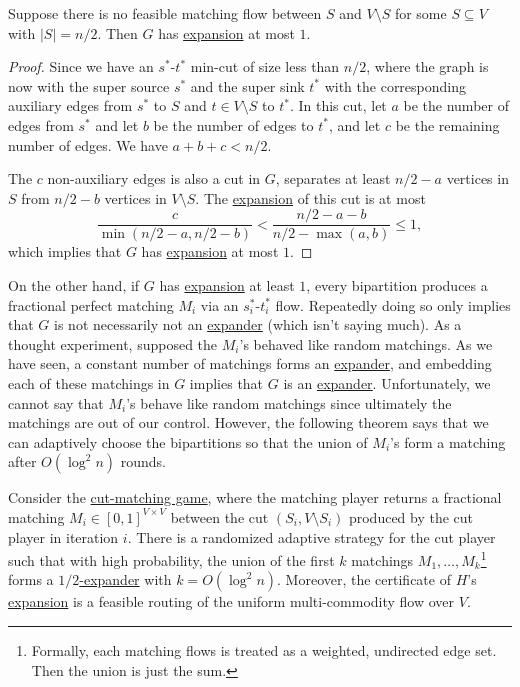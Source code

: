\begin{lemma}\label{lma:cut-matching-fail}
	Suppose there is no feasible matching flow between \(S\) and \(V\setminus S\) for some \(S \subseteq V\) with \(\lvert S \rvert = n / 2\). Then \(G\) has \hyperref[def:expansion]{expansion} at most \(1\).
\end{lemma}
\begin{proof}
	Since we have an \(s^{\ast}\)-\(t^{\ast} \) min-cut of size less than \(n / 2\), where the graph is now with the super source \(s^{\ast} \) and the super sink \(t^{\ast} \) with the corresponding auxiliary edges from \(s^{\ast} \) to \(S\) and \(t \in V\setminus S\) to \(t^{\ast} \). In this cut, let \(a\) be the number of edges from \(s^{\ast} \) and let \(b\) be the number of edges to \(t^{\ast} \), and let \(c\) be the remaining number of edges. We have \(a + b + c < n / 2\).

	The \(c\) non-auxiliary edges is also a cut in \(G\), separates at least \(n / 2 - a\) vertices in \(S\) from \(n / 2 - b\) vertices in \(V\setminus S\). The \hyperref[def:expansion]{expansion} of this cut is at most
	\[
		\frac{c}{\min (n / 2 - a, n / 2 - b)}
		< \frac{n / 2 - a - b}{n / 2 - \max (a, b)}
		\leq 1,
	\]
	which implies that \(G\) has \hyperref[def:expansion]{expansion} at most \(1\).
\end{proof}

On the other hand, if \(G\) has \hyperref[def:expansion]{expansion} at least \(1\), every bipartition produces a fractional perfect matching \(M_i\) via an \(s^{\ast} _i\)-\(t^{\ast} _i\) flow. Repeatedly doing so only implies that \(G\) is not necessarily not an \hyperref[def:expander]{expander} (which isn't saying much). As a thought experiment, supposed the \(M_i\)'s behaved like random matchings. As we have seen, a constant number of matchings forms an \hyperref[def:expander]{expander}, and embedding each of these matchings in \(G\) implies that \(G\) is an \hyperref[def:expander]{expander}. Unfortunately, we cannot say that \(M_i\)'s behave like random matchings since ultimately the matchings are out of our control. However, the following theorem says that we can adaptively choose the bipartitions so that the union of \(M_i\)'s form a matching after \(O(\log ^2 n)\) rounds.

\begin{theorem}\label{thm:cut-matching-succeed}
	Consider the \hyperref[def:cut-matching-game]{cut-matching game}, where the matching player returns a fractional matching \(M_i \in [0, 1]^{V \times V}\) between the cut \((S_i, V\setminus S_i)\) produced by the cut player in iteration \(i\). There is a randomized adaptive strategy for the cut player such that with high probability, the union of the first \(k\) matchings \(M_1, \dots , M_k\)\footnote{Formally, each matching flows is treated as a weighted, undirected edge set. Then the union is just the sum.} forms a \hyperref[def:expander]{\(1 / 2\)-expander} with \(k = O(\log ^2 n)\). Moreover, the certificate of \(H\)'s \hyperref[def:expansion]{expansion} is a feasible routing of the uniform multi-commodity flow over \(V\).
\end{theorem}

